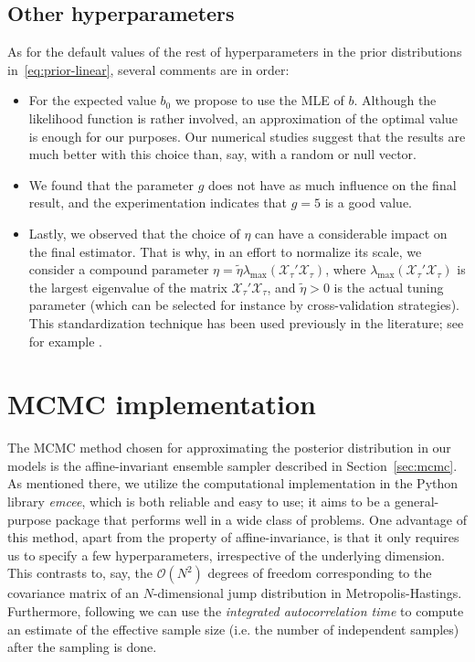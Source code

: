 \subsection*{Other hyperparameters}

As for the default values of the rest of hyperparameters in the prior distributions in~\eqref{eq:prior-linear}, several comments are in order:
\begin{itemize}
  \item For the expected value \(b_0\) we propose to use the MLE of \(b\). Although the likelihood function is rather involved, an approximation of the optimal value is enough for our purposes. Our numerical studies suggest that the results are much better with this choice than, say, with a random or null vector.
  \item We found that the parameter \(g\) does not have as much influence on the final result, and the experimentation indicates that \(g=5\) is a good value.
  \item Lastly, we observed that the choice of \(\eta\) can have a considerable impact on the final estimator. That is why, in an effort to normalize its scale, we consider a compound parameter \(\eta = \tilde \eta \lambda_{\max}(\mathcal X_\tau'\mathcal X_\tau)\), where \(\lambda_{\max}(\mathcal X_\tau'\mathcal X_\tau)\) is the largest eigenvalue of the matrix \(\mathcal X_\tau'\mathcal X_\tau\), and \(\tilde\eta > 0\) is the actual tuning parameter (which can be selected for instance by cross-validation strategies). This standardization technique has been used previously in the literature; see for example \citet{grollemund2019bayesian}.
\end{itemize}

\section{MCMC implementation}

The MCMC method chosen for approximating the posterior distribution in our models is the affine-invariant ensemble sampler described in Section~\ref{sec:mcmc}. As mentioned there, we utilize the computational implementation in the Python library \textit{emcee}, which is both reliable and easy to use; it aims to be a general-purpose package that performs well in a wide class of problems. One advantage of this method, apart from the property of affine-invariance, is that it only requires us to specify a few hyperparameters, irrespective of the underlying dimension. This contrasts to, say, the \(\mathcal O(N^2)\) degrees of freedom corresponding to the covariance matrix of an \(N\)-dimensional jump distribution in Metropolis-Hastings.
Furthermore, following \citet{goodman2010ensemble} we can use the \textit{integrated autocorrelation time} to compute an estimate of the effective sample size (i.e. the number of independent samples) after the sampling is done.

